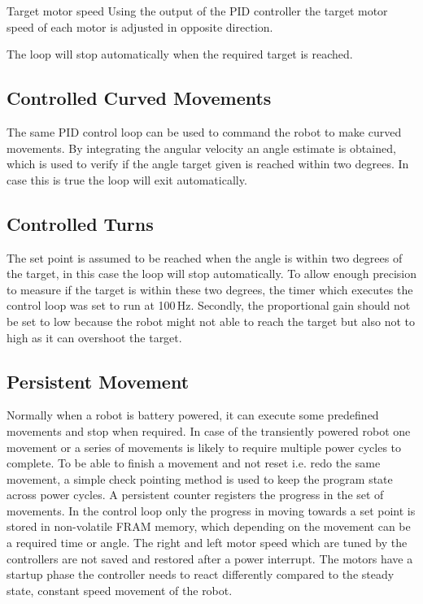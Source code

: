 Target motor speed 
Using the output of the PID controller the target motor speed of each motor is adjusted in opposite direction.

The loop will stop automatically when the required target is reached.

\subsection{Controlled Curved Movements}
The same PID control loop can be used to command the robot to make curved movements.
By integrating the angular velocity an angle estimate is obtained, which is used to verify if the angle target given is reached within two degrees.
In case this is true the loop will exit automatically.

\subsection{Controlled Turns}
The set point is assumed to be reached when the angle is within two degrees of the target, in this case the loop will stop automatically.
To allow enough precision to measure if the target is within these two degrees, the timer which executes the control loop was set to run at 100\,Hz.
Secondly, the proportional gain should not be set to low because the robot might not able to reach the target but also not to high as it can overshoot the target.


\subsection{Persistent Movement}

Normally when a robot is battery powered, it can execute some predefined movements and stop when required.
In case of the transiently powered robot one movement or a series of movements is likely to require multiple power cycles to complete.
To be able to finish a movement and not reset i.e. redo the same movement, a simple check pointing method is used to keep the program state across power cycles.
A persistent counter registers the progress in the set of movements.
In the control loop only the progress in moving towards a set point is stored in non-volatile FRAM memory, which depending on the movement can be a required time or angle.
The right and left motor speed which are tuned by the controllers are not saved and restored after a power interrupt.
The motors have a startup phase the controller needs to react differently compared to the steady state, constant speed movement of the robot. 